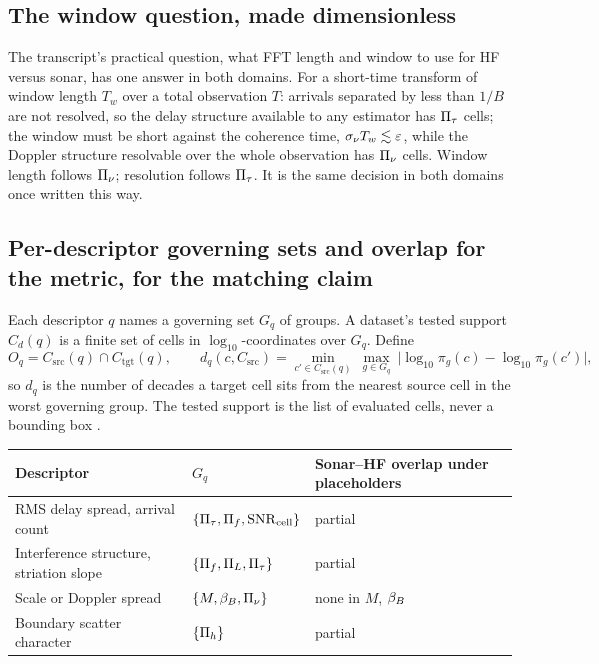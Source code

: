 \subsection{The window question, made dimensionless}

The transcript's practical question, what FFT length and window to use for HF versus sonar, has one answer in both domains. For a short-time transform of window length $T_w$ over a total observation $T$: arrivals separated by less than $1/B$ are not resolved, so the delay structure available to any estimator has $\Pi_{\tau}$ cells; the window must be short against the coherence time, $\sigma_{\nu} T_w\lesssim\varepsilon$, while the Doppler structure resolvable over the whole observation has $\Pi_{\nu}$ cells. Window length follows $\Pi_{\nu}$; resolution follows $\Pi_{\tau}$. It is the same decision in both domains once written this way.

\subsection[Per-descriptor governing sets and overlap]{Per-descriptor governing sets and overlap\hfill{\normalfont\small \tagP{} for the metric, \tagH{} for the matching claim}}

Each descriptor $q$ names a governing set $G_q$ of groups. A dataset's tested support $C_d(q)$ is a finite set of cells in $\log_{10}$-coordinates over $G_q$. Define
\begin{equation}
  O_q = C_{\mathrm{src}}(q)\cap C_{\mathrm{tgt}}(q),
  \qquad
  d_q(c, C_{\mathrm{src}}) = \min_{c'\in C_{\mathrm{src}}(q)}\ \max_{g\in G_q}\ \big|\log_{10}\pi_g(c)-\log_{10}\pi_g(c')\big| ,
  \label{eq:overlap}
\end{equation}
so $d_q$ is the number of decades a target cell sits from the nearest source cell in the worst governing group. The tested support is the list of evaluated cells, never a bounding box \tagG{}.

\begin{center}
\small
\begin{tabular}{@{}lll@{}}
\toprule
Descriptor & $G_q$ & Sonar--HF overlap under placeholders \\
\midrule
RMS delay spread, arrival count & $\{\Pi_{\tau},\Pi_{f},\mathrm{SNR}_{\mathrm{cell}}\}$ & partial \\
Interference structure, striation slope & $\{\Pi_{f},\Pi_{L},\Pi_{\tau}\}$ & partial \\
Scale or Doppler spread & $\{M,\beta_{B},\Pi_{\nu}\}$ & none in $M$, $\beta_{B}$ \\
Boundary scatter character & $\{\Pi_{h}\}$ & partial \\
\bottomrule
\end{tabular}
\end{center}

